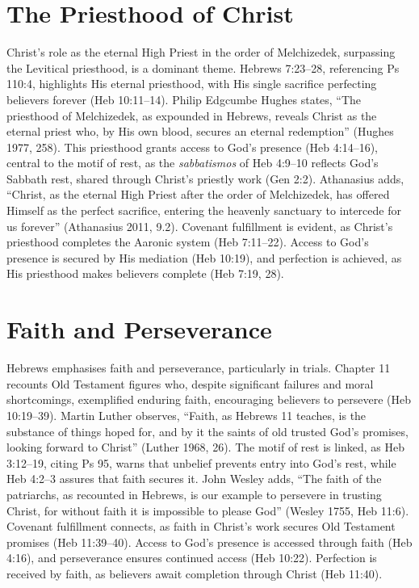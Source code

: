 \documentclass[12pt]{article}
\begin{document}
\section{The Priesthood of Christ}
Christ’s role as the eternal High Priest in the order of Melchizedek,
surpassing the Levitical priesthood, is a dominant theme. Hebrews 7:23--28,
referencing Ps 110:4, highlights His eternal priesthood, with His single
sacrifice perfecting believers forever (Heb 10:11--14). Philip Edgcumbe Hughes
states, ``The priesthood of Melchizedek, as expounded in Hebrews, reveals
Christ as the eternal priest who, by His own blood, secures an eternal
redemption'' (Hughes 1977, 258). This priesthood grants access to God’s
presence (Heb 4:14--16), central to the motif of rest, as the
\textit{sabbatismos} of Heb 4:9--10 reflects God’s Sabbath rest, shared through
Christ’s priestly work (Gen 2:2). Athanasius adds, ``Christ, as the eternal
High Priest after the order of Melchizedek, has offered Himself as the perfect
sacrifice, entering the heavenly sanctuary to intercede for us forever''
(Athanasius 2011, 9.2). Covenant fulfillment is evident, as Christ’s priesthood
completes the Aaronic system (Heb 7:11--22). Access to God’s presence is
secured by His mediation (Heb 10:19), and perfection is achieved, as His
priesthood makes believers complete (Heb 7:19, 28).

\section{Faith and Perseverance}
Hebrews emphasises faith and perseverance, particularly in trials. Chapter 11
recounts Old Testament figures who, despite significant failures and moral
shortcomings, exemplified enduring faith, encouraging believers to persevere
(Heb 10:19--39). Martin Luther observes, ``Faith, as Hebrews 11 teaches, is the
substance of things hoped for, and by it the saints of old trusted God’s
promises, looking forward to Christ'' (Luther 1968, 26). The motif of rest is
linked, as Heb 3:12--19, citing Ps 95, warns that unbelief prevents entry into
God’s rest, while Heb 4:2--3 assures that faith secures it. John Wesley adds,
``The faith of the patriarchs, as recounted in Hebrews, is our example to
persevere in trusting Christ, for without faith it is impossible to please
God'' (Wesley 1755, Heb 11:6). Covenant fulfillment connects, as faith in
Christ’s work secures Old Testament promises (Heb 11:39--40). Access to God’s
presence is accessed through faith (Heb 4:16), and perseverance ensures
continued access (Heb 10:22). Perfection is received by faith, as believers
await completion through Christ (Heb 11:40).
\end{document}

